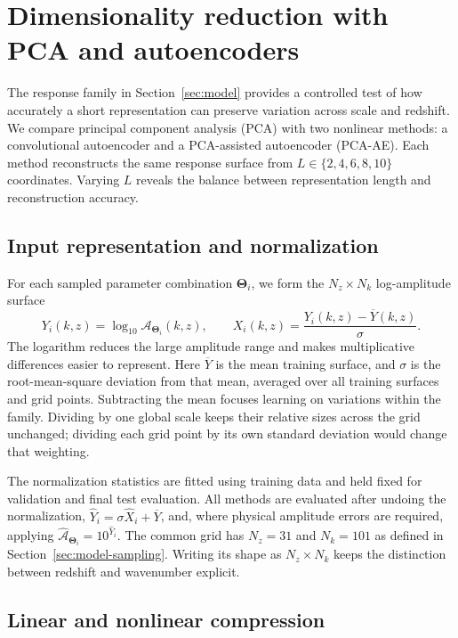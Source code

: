 \section{Dimensionality reduction with PCA and autoencoders}
\label{sec:autoencoder}

The response family in Section~\ref{sec:model} provides a controlled test
of how accurately a short representation can preserve variation across
scale and redshift. We compare principal component analysis (PCA) with two
nonlinear methods: a convolutional autoencoder and a PCA-assisted
autoencoder (PCA-AE). Each method reconstructs the same response surface
from $L\in\{2,4,6,8,10\}$ coordinates. Varying $L$ reveals the balance
between representation length and reconstruction accuracy.

\subsection{Input representation and normalization}
\label{sec:input-representation}

For each sampled parameter combination $\bm{\Theta}_i$, we form the
$N_z\times N_k$ log-amplitude surface
\begin{equation}
  Y_i(k,z)=\log_{10}\mathcal A_{\bm{\Theta}_i}(k,z),
  \qquad
  X_i(k,z)=\frac{Y_i(k,z)-\overline Y(k,z)}{\sigma}.
  \label{eq:surface-normalization}
\end{equation}
The logarithm reduces the large amplitude range and makes multiplicative
differences easier to represent. Here $\overline Y$ is the mean training
surface, and $\sigma$ is the root-mean-square deviation from that mean,
averaged over all training surfaces and grid points. Subtracting the mean
focuses learning on variations within the family. Dividing by one global
scale keeps their relative sizes across the grid unchanged; dividing each
grid point by its own standard deviation would change that weighting.

The normalization statistics are fitted using training data and held fixed
for validation and final test evaluation. All methods are evaluated after
undoing the normalization,
$\widehat Y_i=\sigma\widehat X_i+\overline Y$, and, where physical
amplitude errors are required, applying
$\widehat{\mathcal A}_{\bm{\Theta}_i}=10^{\widehat Y_i}$.
The common grid has $N_z=31$ and $N_k=101$ as defined in
Section~\ref{sec:model-sampling}. Writing its shape as $N_z\times N_k$
keeps the distinction between redshift and wavenumber explicit.

\subsection{Linear and nonlinear compression}
\label{sec:compression-principles}

